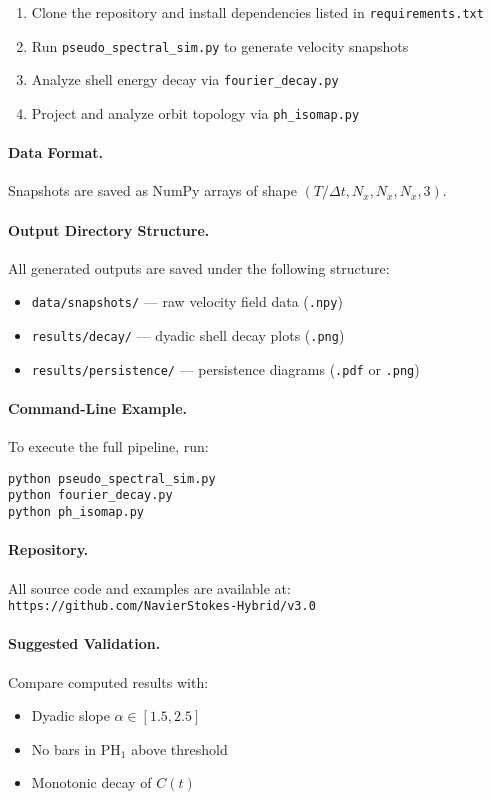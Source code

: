 \documentclass[11pt]{article}
\theoremstyle{definition}
\begin{document}
\begin{enumerate}
  \item Clone the repository and install dependencies listed in \texttt{requirements.txt}
  \item Run \texttt{pseudo\_spectral\_sim.py} to generate velocity snapshots
  \item Analyze shell energy decay via \texttt{fourier\_decay.py}
  \item Project and analyze orbit topology via \texttt{ph\_isomap.py}
\end{enumerate}

\paragraph{Data Format.} Snapshots are saved as NumPy arrays of shape \( (T/\Delta t, N_x, N_x, N_x, 3) \).

\paragraph{Output Directory Structure.}
All generated outputs are saved under the following structure:
\begin{itemize}
  \item \texttt{data/snapshots/} — raw velocity field data (\texttt{.npy})
  \item \texttt{results/decay/} — dyadic shell decay plots (\texttt{.png})
  \item \texttt{results/persistence/} — persistence diagrams (\texttt{.pdf} or \texttt{.png})
\end{itemize}

\paragraph{Command-Line Example.}
To execute the full pipeline, run:
\begin{verbatim}
python pseudo_spectral_sim.py
python fourier_decay.py
python ph_isomap.py
\end{verbatim}

\paragraph{Repository.}
All source code and examples are available at: \texttt{https://github.com/NavierStokes-Hybrid/v3.0}

\paragraph{Suggested Validation.}
Compare computed results with:
\begin{itemize}
  \item Dyadic slope \( \alpha \in [1.5, 2.5] \)
  \item No bars in \( \mathrm{PH}_1 \) above threshold
  \item Monotonic decay of \( C(t) \)
\end{itemize}
\end{document}
